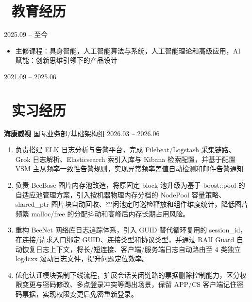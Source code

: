 \documentclass[10pt]{article}
\begin{document}
\vspace{-0.12em}
{\fontsize{8.75pt}{10.85pt}\selectfont

\section{\makebox[\widthof{\faGraduationCap}][c]{\color{CVBlue}\faGraduationCap}\ 教育经历}

\noindent{}%
%
\hfill 2025.09 -- 至今
\begin{itemize}
    \item 主修课程：具身智能，人工智能算法与系统，人工智能理论和高级应用，AI 赋能：创新思维引领下的产品设计
\end{itemize}

\vspace{0.08em}
\noindent{}%
%
\hfill 2021.09 -- 2025.06

\section{\makebox[\widthof{\faBriefcase}][c]{\color{CVBlue}\faBriefcase}\ 实习经历}

\textbf{海康威视} \quad 国际业务部/基础架构组 \hfill 2026.03 -- 2026.06
\begin{enumerate}
    \item 负责搭建 ELK 日志分析与告警平台，完成 Filebeat/Logstash 采集链路、Grok 日志解析、Elasticsearch 索引入库与 Kibana 检索配置，并基于配置 VSM 主从频率一致性告警规则，实现异常频率差值自动检测和邮件告警通知
    \item 负责 BeeBase 图片内存池改造，将原固定 block 池升级为基于 boost::pool 的自适应池管理方案，引入按机器物理内存分档的 NodePool 容量策略、shared\_ptr 图片块自动回收、空闲池定时巡检释放和组件维度统计，降低图片频繁 malloc/free 的分配抖动和高峰后内存长期占用风险。
    \item 重构 BeeNet 网络库日志追踪体系，引入 GUID 替代循环复用的 session\_id，在连接/请求入口绑定 GUID、连接类型和协议类型，并通过 RAII Guard 自动恢复日志上下文，将长/短连接、客户端/服务端日志自动路由至 4 类独立 log4cxx 滚动日志文件，提升问题定位效率。
    \item 优化认证模块强制下线流程，扩展会话关闭链路的票据删除控制能力，区分权限变更与密码修改、多点登录冲突等踢出场景，保留 APP/CS 客户端记住密码票据，实现权限变更后免密重新登录。
\end{enumerate}

}
\end{document}
